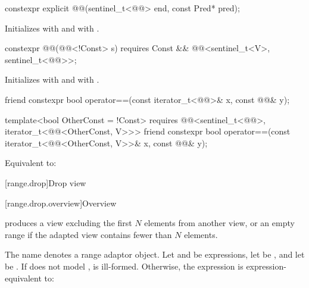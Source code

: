 %
\begin{itemdecl}
constexpr explicit @@(sentinel_t<@@> end, const Pred* pred);
\end{itemdecl}

\begin{itemdescr}
\pnum
\effects
Initializes  with  and  with .
\end{itemdescr}

%
\begin{itemdecl}
constexpr @@(@@<!Const> s)
  requires Const && @@<sentinel_t<V>, sentinel_t<@@>>;
\end{itemdecl}

\begin{itemdescr}
\pnum
\effects
Initializes  with  and
 with .
\end{itemdescr}

%
\begin{itemdecl}
friend constexpr bool operator==(const iterator_t<@@>& x, const @@& y);

template<bool OtherConst = !Const>
  requires @@<sentinel_t<@@>, iterator_t<@@<OtherConst, V>>>
friend constexpr bool operator==(const iterator_t<@@<OtherConst, V>>& x,
                                 const @@& y);
\end{itemdecl}

\begin{itemdescr}
\pnum
\effects
Equivalent to:
\end{itemdescr}

[range.drop]{Drop view}

[range.drop.overview]{Overview}

\pnum
{} produces a view
excluding the first $N$ elements from another view, or
an empty range if the adapted view contains fewer than $N$ elements.

\pnum
{}%
The name  denotes
a range adaptor object.
Let  and  be expressions,
let  be , and
let  be .
If  does not model
,
 is ill-formed.
Otherwise, the expression 
is expression-equivalent to:

